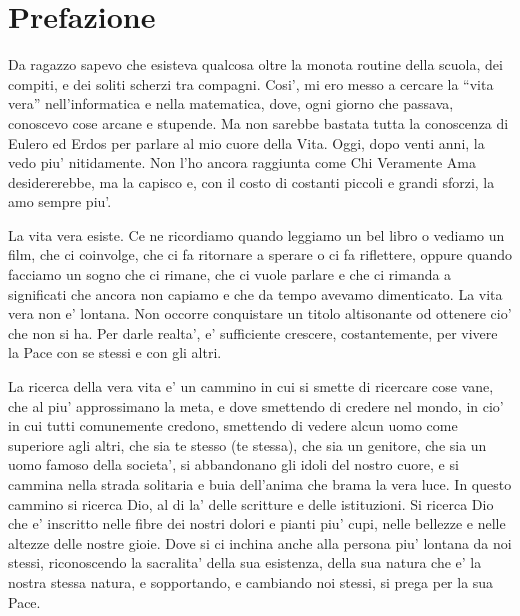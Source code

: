 \chapter{Prefazione}
Da ragazzo sapevo che esisteva qualcosa oltre la monota routine della scuola, dei compiti, e dei soliti scherzi tra compagni. Cosi', mi ero messo a cercare la ``vita vera'' nell'informatica e nella matematica, dove, ogni giorno che passava, conoscevo cose arcane e stupende. Ma non sarebbe bastata tutta la conoscenza di Eulero ed Erdos per parlare al mio cuore della Vita. Oggi, dopo venti anni, la vedo piu' nitidamente. Non l'ho ancora raggiunta come Chi Veramente Ama desidererebbe, ma la capisco e, con il costo di costanti piccoli e grandi sforzi, la amo sempre piu'.

La vita vera esiste. Ce ne ricordiamo quando leggiamo un bel libro o vediamo un film, che ci coinvolge, che ci fa ritornare a sperare o ci fa riflettere, oppure quando facciamo un sogno che ci rimane, che ci vuole parlare e che ci rimanda a significati che ancora non capiamo e che da tempo avevamo dimenticato. La vita vera non e' lontana. Non occorre conquistare un titolo altisonante od ottenere cio' che non si ha. Per darle realta', e' sufficiente crescere, costantemente, per vivere la Pace con se stessi e con gli altri. 

La ricerca della vera vita e' un cammino in cui si smette di ricercare cose vane, che al piu' approssimano la meta, e dove smettendo di credere nel mondo, in cio' in cui tutti comunemente credono, smettendo di vedere alcun uomo come superiore agli altri, che sia te stesso (te stessa), che sia un genitore, che sia un uomo famoso della societa', si abbandonano gli idoli del nostro cuore, e si cammina nella strada solitaria e buia dell'anima che brama la vera luce. In questo cammino si ricerca Dio, al di la' delle scritture e delle istituzioni. Si ricerca Dio che e' inscritto nelle fibre dei nostri dolori e pianti piu' cupi, nelle bellezze e nelle altezze delle nostre gioie. Dove si ci inchina anche alla persona piu' lontana da noi stessi, riconoscendo la sacralita' della sua esistenza, della sua natura che e' la nostra stessa natura, e sopportando, e cambiando noi stessi, si prega per la sua Pace.

